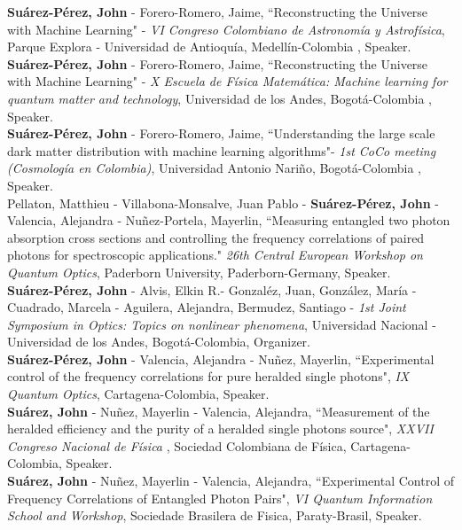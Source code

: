 \documentclass[10pt, a4paper]{article}
\newcommand{\years}[1]{\marginnote{\scriptsize #1}}
\begin{document}
\newpage
\years{2019}\textbf{Suárez-Pérez, John} - Forero-Romero, Jaime, “Reconstructing the Universe with Machine Learning" - \emph{VI Congreso Colombiano de Astronomía y Astrofísica}, Parque Explora - Universidad de Antioquía, Medellín-Colombia , Speaker.\\

\years{2019}\textbf{Suárez-Pérez, John} - Forero-Romero, Jaime, “Reconstructing the Universe with Machine Learning" - \emph{X Escuela de Física Matemática: Machine learning for quantum matter and technology}, Universidad de los Andes, Bogotá-Colombia , Speaker.\\

\years{2019}\textbf{Suárez-Pérez, John} - Forero-Romero, Jaime, “Understanding the large scale dark matter distribution with machine learning
algorithms"- \emph{1st CoCo meeting (Cosmología en Colombia)}, Universidad Antonio Nariño, Bogotá-Colombia , Speaker.\\

\years{2019}Pellaton, Matthieu - Villabona-Monsalve, Juan Pablo - \textbf{Suárez-Pérez, John} - Valencia, Alejandra - Nuñez-Portela, Mayerlin, “Measuring entangled two photon absorption cross sections and controlling the frequency correlations of paired photons for spectroscopic applications." \emph{26th Central European Workshop on Quantum Optics}, Paderborn University, Paderborn-Germany, Speaker.\\

\years{2018}\textbf{Suárez-Pérez, John} - Alvis, Elkin R.- Gonzaléz, Juan, González, María - Cuadrado, Marcela - Aguilera, Alejandra, Bermudez, Santiago - \emph{1st Joint Symposium in Optics: Topics on nonlinear phenomena}, Universidad Nacional - Universidad de los Andes, Bogotá-Colombia, Organizer.\\

\years{2018}\textbf{Suárez-Pérez, John} - Valencia, Alejandra - Nuñez, Mayerlin, “Experimental control of the frequency correlations for pure heralded single photons", \emph{IX Quantum Optics}, Cartagena-Colombia, Speaker.\\

\years{2017}\textbf{Suárez, John} - Nuñez, Mayerlin - Valencia, Alejandra, “Measurement of the heralded efficiency and the purity of a heralded single photons source", \emph{XXVII Congreso Nacional de Física} , Sociedad Colombiana de Física, Cartagena-Colombia, Speaker.\\

\years{2017}\textbf{Suárez, John} - Nuñez, Mayerlin - Valencia, Alejandra, “Experimental Control of Frequency Correlations of Entangled Photon Pairs", \emph{VI Quantum Information School and Workshop}, Sociedade Brasilera de Fisica, Paraty-Brasil, Speaker.\\
\end{document}
